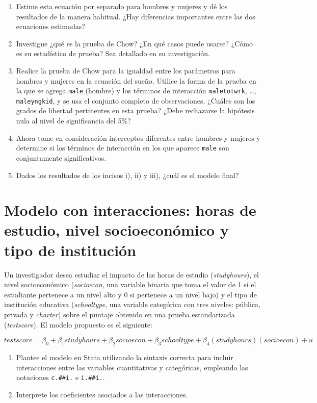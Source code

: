 \documentclass[12pt]{article}
\begin{document}
\begin{enumerate}[label=\alph*)]
    \item Estime esta ecuación por separado para hombres y mujeres y dé los resultados de la manera habitual. 
    ¿Hay diferencias importantes entre las dos ecuaciones estimadas?

    \item Investigue ¿qué es la prueba de Chow? ¿En qué casos puede usarse? 
    ¿Cómo es su estadístico de prueba? Sea detallado en su investigación.

    \item Realice la prueba de Chow para la igualdad entre los parámetros para hombres y mujeres en la ecuación del sueño. 
    Utilice la forma de la prueba en la que se agrega \texttt{male} (hombre) y los términos de interacción 
    \texttt{maletotwrk}, \ldots, \texttt{maleyngkid}, y se usa el conjunto completo de observaciones. 
    ¿Cuáles son los grados de libertad pertinentes en esta prueba? 
    ¿Debe rechazarse la hipótesis nula al nivel de significancia del 5\%?

    \item Ahora tome en consideración interceptos diferentes entre hombres y mujeres y determine si los términos de interacción en los que aparece \texttt{male} son conjuntamente significativos.

    \item Dados los resultados de los incisos i), ii) y iii), ¿cuál es el modelo final?
\end{enumerate}

\section{Modelo con interacciones: horas de estudio, nivel socioeconómico y tipo de institución}

Un investigador desea estudiar el impacto de las horas de estudio (\textit{studyhours}), 
el nivel socioeconómico (\textit{socioecon}, una variable binaria que toma el valor de 1 si el estudiante 
pertenece a un nivel alto y 0 si pertenece a un nivel bajo) y el tipo de institución educativa 
(\textit{schooltype}, una variable categórica con tres niveles: pública, privada y \textit{charter}) 
sobre el puntaje obtenido en una prueba estandarizada (\textit{testscore}). 
El modelo propuesto es el siguiente:

\[
testscore = \beta_{0} + \beta_{1}studyhours + \beta_{2}socioecon 
+ \beta_{3}schooltype + \beta_{4}(studyhours)(socioecon) + u
\]

\begin{enumerate}[label=\alph*)]
    \item Plantee el modelo en Stata utilizando la sintaxis correcta para incluir interacciones entre 
    las variables cuantitativas y categóricas, empleando las notaciones \texttt{c.\#\#i.} e \texttt{i.\#\#i.}.
    \item Interprete los coeficientes asociados a las interacciones.
\end{enumerate}
\end{document}
